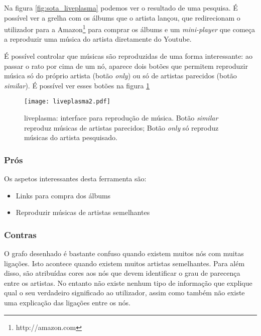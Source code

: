 Na figura \ref{fig:sota_liveplasma} podemos ver o resultado de uma pesquisa.
É possível ver a grelha com os álbums que o artista lançou, que redirecionam o utilizador para a Amazon\footnote{http://amazon.com} para comprar os álbums e um \emph{mini-player} que começa a reproduzir uma música do artista diretamente do Youtube.

É possível controlar que músicas são reproduzidas de uma forma interessante: ao passar o rato por cima de um nó, aparece dois botões que permitem reproduzir música só do próprio artista (botão \emph{only}) ou só de artistas parecidos (botão \emph{similar}).
É possível ver esses botões na figura \ref{fig:sota_liveplasma2}

\begin{figure}[tb]
  \begin{center}
    \texttt{[image: liveplasma2.pdf]}
  \end{center}
  \caption{liveplasma: interface para reprodução de música. Botão \emph{similar} reproduz músicas de artistas parecidos; Botão \emph{only} só reproduz músicas do artista pesquisado.}
  \label{fig:sota_liveplasma2}
\end{figure}

\subsubsection{Prós} %
\label{ssub:liveplasma_pros}

Os aspetos interessantes desta ferramenta são:

\begin{itemize}
  \item Links para compra dos álbums
  \item Reproduzir músicas de artistas semelhantes
\end{itemize}


\subsubsection{Contras} %
\label{ssub:liveplasma_contras}

O grafo desenhado é bastante confuso quando existem muitos nós com muitas ligações.
Isto acontece quando existem muitos artistas semelhantes.
Para além disso, são atribuídas cores aos nós que devem identificar o grau de parecença entre os artistas.
No entanto não existe nenhum tipo de informação que explique qual o seu verdadeiro significado ao utilizador, assim como também não existe uma explicação das ligações entre os nós.

